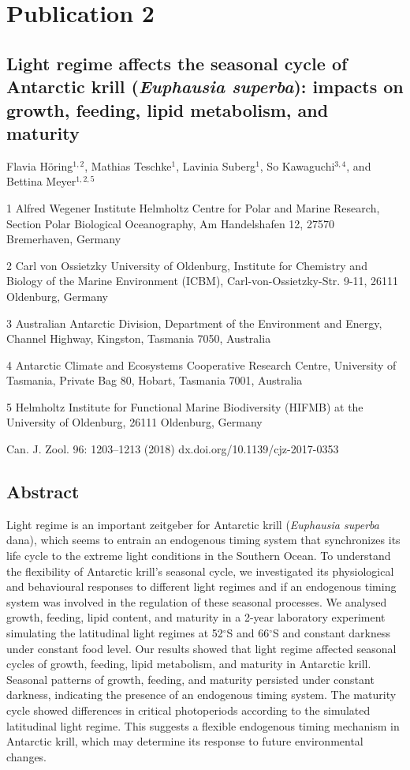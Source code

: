 \chapter[Publication 2]{Publication 2}

\section*{Light regime affects the seasonal cycle of Antarctic krill (\textit{Euphausia superba}): impacts on growth, feeding, lipid metabolism, and maturity}

Flavia Höring$^{1,2}$, Mathias Teschke$^{1}$, Lavinia Suberg$^{1}$, So Kawaguchi$^{3,4}$, and Bettina Meyer$^{1,2,5}$


{\scriptsize
1 Alfred Wegener Institute Helmholtz Centre for Polar and Marine Research, Section Polar Biological Oceanography, Am Handelshafen 12, 27570 Bremerhaven, Germany

2 Carl von Ossietzky University of Oldenburg, Institute for Chemistry and Biology of the Marine Environment (ICBM), Carl-von-Ossietzky-Str. 9-11, 26111 Oldenburg, Germany

3 Australian Antarctic Division, Department of the Environment and Energy, Channel Highway, Kingston, Tasmania 7050, Australia

4 Antarctic Climate and Ecosystems Cooperative Research Centre, University of Tasmania, Private Bag 80, Hobart, Tasmania 7001, Australia

5 Helmholtz Institute for Functional Marine Biodiversity (HIFMB) at the University of Oldenburg, 26111 Oldenburg, Germany 
}


Can. J. Zool. 96: 1203–1213 (2018) dx.doi.org/10.1139/cjz-2017-0353 

\section{Abstract}

Light regime is an important zeitgeber for Antarctic krill (\textit{Euphausia
superba} dana), which seems to entrain an endogenous timing system that
synchronizes its life cycle to the extreme light conditions in the Southern
Ocean. To understand the flexibility of Antarctic krill’s seasonal cycle, we
investigated its physiological and behavioural responses to different light
regimes and if an endogenous timing system was involved in the regulation of
these seasonal processes. We analysed growth, feeding, lipid content, and
maturity in a 2-year laboratory experiment simulating the latitudinal light
regimes at 52$^{\circ}$S and 66$^{\circ}$S and constant darkness under constant
food level. Our results showed that light regime affected seasonal cycles of
growth, feeding, lipid metabolism, and maturity in Antarctic krill. Seasonal
patterns of growth, feeding, and maturity persisted under constant darkness,
indicating the presence of an endogenous timing system. The maturity cycle
showed differences in critical photoperiods according to the simulated
latitudinal light regime. This suggests a flexible endogenous timing mechanism
in Antarctic krill, which may determine its response to future environmental
changes.

